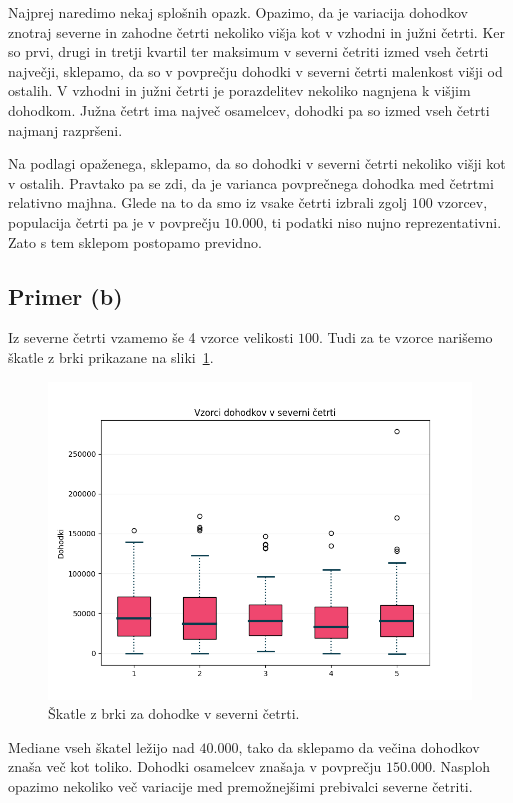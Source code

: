 \documentclass[a4paper,11pt]{article}
\begin{document}
Najprej naredimo nekaj splošnih opazk.
Opazimo, da je variacija dohodkov znotraj severne in zahodne četrti nekoliko višja kot v vzhodni in južni četrti. 
Ker so prvi, drugi in tretji kvartil ter maksimum v severni četriti izmed vseh četrti največji, 
sklepamo, da so v povprečju dohodki v severni četrti malenkost višji od ostalih. 
V vzhodni in južni četrti je porazdelitev nekoliko nagnjena k višjim dohodkom. 
Južna četrt ima največ osamelcev, dohodki pa so izmed vseh četrti najmanj razpršeni.

Na podlagi opaženega, sklepamo, da so dohodki v severni četrti nekoliko višji kot v ostalih.
Pravtako pa se zdi, da je varianca povprečnega dohodka med četrtmi relativno majhna.
Glede na to da smo iz vsake četrti izbrali zgolj $100$ vzorcev, populacija četrti pa je v povprečju $10.000$, ti podatki niso nujno reprezentativni.
Zato s tem sklepom postopamo previdno.

\subsection*{Primer (b)}

Iz severne četrti vzamemo še 4 vzorce velikosti $100$.
Tudi za te vzorce narišemo škatle z brki prikazane na sliki~\ref{brke_sever}.

\begin{figure}[H]
    \centering
    \includegraphics[scale=0.65]{Skatle_z_brki_Sever.png}
    \caption{Škatle z brki za dohodke v severni četrti.}
    \label{brke_sever}
\end{figure}

Mediane vseh škatel ležijo nad $40.000$, tako da sklepamo da večina dohodkov znaša več kot toliko.
Dohodki osamelcev znašaja v povprečju $150.000$.
Nasploh opazimo nekoliko več variacije med premožnejšimi prebivalci severne četriti.
\end{document}
